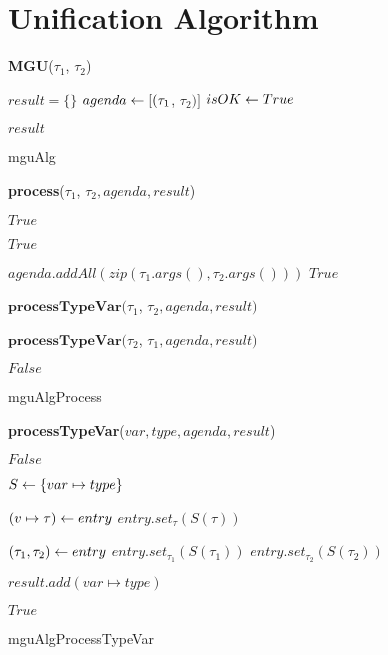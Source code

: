 \documentclass[a4paper,oneside]{memoir}
\begin{document}
\section{Unification Algorithm}

{\textbf{MGU}($\tau_1$, $\tau_2$)}{
	
	$result = \{\}$ \;
	$agenda \leftarrow [(\tau_1$, $\tau_2)]$ \;	
	$isOK \leftarrow True$ \;

	\;	
	
	\;
	
	 {
		\Return $result$
	} \Else {
		\Return $\bot$				
	}
	
}{mguAlg}

{\textbf{process}($\tau_1$, $\tau_2, agenda, result$)}{
	\;
	 {
		\Return $True$
	} \;

	 {
		\Return $True$
	} \;

	 {
		$agenda.addAll(zip(\tau_1.args(), \tau_2.args()))$ \;
		\Return $True$
	} \;
	
	 {
		\Return $\textbf{processTypeVar}(\tau_1$, $\tau_2, agenda, result)$
	} \;
	
	 {
		\Return $\textbf{processTypeVar}(\tau_2$, $\tau_1, agenda, result)$
	} \;	
	
	\Return $False$
	
}{mguAlgProcess}

{\textbf{processTypeVar}($var, type, agenda, result$)}{
	\;
	
	 {
		\Return $False$
	} \;

	$S \leftarrow \{var \mapsto type \}$\;\;

	 {
		$(v \mapsto \tau) \leftarrow entry$ \;
		$entry.set_{\tau}( S(\tau) )$
	} \;

	 {
		$(\tau_1, \tau_2) \leftarrow entry$ \;
		$entry.set_{\tau_1}( S(\tau_1) )$ \;
		$entry.set_{\tau_2}( S(\tau_2) )$
	} \;

	
	$result.add(var \mapsto type)$ \;\;
	
	\Return $True$
	
}{mguAlgProcessTypeVar}
\end{document}
